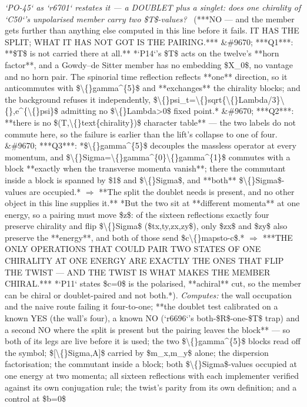 \begin{description}
\textit{`PO-45` as `r6701` restates it --- a DOUBLET plus a singlet: does one chirality of `C50`'s unpolarised member carry two \$T\$-values?} \ (***NO --- and the member gets further than anything else computed in this line before it fails. IT HAS THE SPLIT; WHAT IT HAS NOT GOT IS THE PAIRING.*** \&\#9670; ***Q1***: **\$T\$ is not carried there at all.** *`P14`'s \$T\$ acts on the twelve's **horn factor**, and a Gowdy--de Sitter member has no embedding \$X\_0\$, no vantage and no horn pair. The spinorial time reflection reflects **one** direction, so it anticommutes with \$\textbackslash\{\}gamma\textasciicircum{}\{5\}\$ and **exchanges** the chirality blocks; and the background refuses it independently, \$\textbackslash\{\}psi\_t=\textbackslash\{\}sqrt\{\textbackslash\{\}Lambda/3\}\textbackslash\{\},e\textasciicircum{}\{\textbackslash\{\}psi\}\$ admitting no \$\textbackslash\{\}Lambda>0\$ fixed point.* \&\#9670; ***Q2***: **there is no \$(T,\textbackslash\{\}text\{chirality\})\$ character table** --- the two labels do not commute here, so the failure is earlier than the lift's collapse to one of four. \&\#9670; ***Q3***: *\$\textbackslash\{\}gamma\textasciicircum{}\{5\}\$ decouples the massless operator at every momentum, and \$\textbackslash\{\}Sigma=\textbackslash\{\}gamma\textasciicircum{}\{0\}\textbackslash\{\}gamma\textasciicircum{}\{1\}\$ commutes with a block **exactly when the transverse momenta vanish**; there the commutant inside a block is spanned by \$1\$ and \$\textbackslash\{\}Sigma\$, and **both** \$\textbackslash\{\}Sigma\$-values are occupied.* \ensuremath{\Rightarrow} **The split the doublet needs is present, and no other object in this line supplies it.** *But the two sit at **different momenta** at one energy, so a pairing must move \$z\$: of the sixteen reflections exactly four preserve chirality and flip \$\textbackslash\{\}Sigma\$ (\$tx,ty,zx,zy\$), only \$zx\$ and \$zy\$ also preserve the **energy**, and both of those send \$c\textbackslash\{\}mapsto-c\$.* \ensuremath{\Rightarrow}  ***THE ONLY OPERATIONS THAT COULD PAIR TWO STATES OF ONE CHIRALITY AT ONE ENERGY ARE EXACTLY THE ONES THAT FLIP THE TWIST --- AND THE TWIST IS WHAT MAKES THE MEMBER CHIRAL.*** *`P11` states \$c=0\$ is the polarised, **achiral** cut, so the member can be chiral or doublet-paired and not both.*). 
\emph{Computes:} the wall occupation and the naive route failing it four-to-one; **the doublet test calibrated on a known YES (the wall's four), a known NO (`r6696`'s both-\$R\$-one-\$T\$ trap) and a second NO where the split is present but the pairing leaves the block** --- so both of its legs are live before it is used; the two \$\textbackslash\{\}gamma\textasciicircum{}\{5\}\$ blocks read off the symbol; \$[\textbackslash\{\}Sigma,A]\$ carried by \$m\_x,m\_y\$ alone; the dispersion factorisation; the commutant inside a block; both \$\textbackslash\{\}Sigma\$-values occupied at one energy at two momenta; all sixteen reflections with each implementer verified against its own conjugation rule; the twist's parity from its own definition; and a control at \$b=0\$

\end{description}
